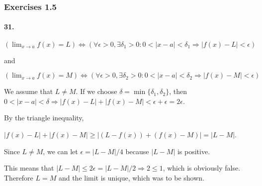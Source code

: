 \subsubsection{Exercises 1.5}

\paragraph{31.}

$(\lim_{x\rightarrow a} f(x) = L) \Leftrightarrow (\forall \epsilon > 0, \exists \delta_1 > 0 : 0<|x-a|<\delta_1 \Rightarrow |f(x)-L|<\epsilon)$

and 

$(\lim_{x\rightarrow a} f(x) = M) \Leftrightarrow (\forall \epsilon > 0, \exists \delta_2 > 0 : 0<|x-a|<\delta_2 \Rightarrow |f(x)-M|<\epsilon)$

We assume that $L \neq M$. If we choose $\delta = \min\{\delta_1, \delta_2\}$, then $0<|x-a|<\delta \Rightarrow |f(x)-L| + |f(x)-M| < \epsilon + \epsilon = 2\epsilon$. 

By the triangle inequality,

$|f(x)-L| + |f(x)-M| \geq |(L-f(x)) + (f(x)-M)| = |L-M|$.

Since $L \neq M$, we can let $\epsilon = |L-M|/4$ because $|L-M|$ is positive.

This means that $|L-M| \leq 2\epsilon = |L-M|/2 \Rightarrow 2 \leq 1$, which is obviously false. Therefore $L = M$ and the limit is unique, which was to be shown.

























































